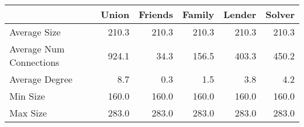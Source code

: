 \begin{tabular}{lrrrrr}
\toprule
                         &   Union &   Friends &   Family &   Lender &   Solver \\
\midrule
 Average Size            &   210.3 &     210.3 &    210.3 &    210.3 &    210.3 \\
 Average Num Connections &   924.1 &      34.3 &    156.5 &    403.3 &    450.2 \\
 Average Degree          &     8.7 &       0.3 &      1.5 &      3.8 &      4.2 \\
 Min Size                &   160.0 &     160.0 &    160.0 &    160.0 &    160.0 \\
 Max Size                &   283.0 &     283.0 &    283.0 &    283.0 &    283.0 \\
\bottomrule
\end{tabular}